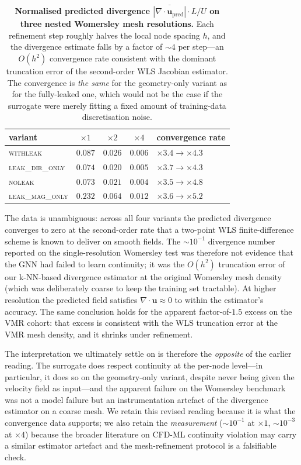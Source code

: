 \documentclass[10pt,a4paper]{article}
\newcommand{\withleak}{\textsc{withleak}}
\newcommand{\dironly}{\textsc{leak\_dir\_only}}
\newcommand{\magonly}{\textsc{leak\_mag\_only}}
\newcommand{\noleak}{\textsc{noleak}}
\begin{document}
\begin{table}[h]
\centering
\small
\begin{tabular}{lccc l}
\toprule
variant & $\times 1$ & $\times 2$ & $\times 4$ & convergence rate \\
\midrule
\withleak{}     & $0.087$ & $0.026$ & $0.006$ & $\times 3.4 \to \times 4.3$ \\
\dironly{}      & $0.074$ & $0.020$ & $0.005$ & $\times 3.7 \to \times 4.3$ \\
\noleak{}       & $0.073$ & $0.021$ & $0.004$ & $\times 3.5 \to \times 4.8$ \\
\magonly{}      & $0.232$ & $0.064$ & $0.012$ & $\times 3.6 \to \times 5.2$ \\
\bottomrule
\end{tabular}
\caption{\textbf{Normalised predicted divergence
$\overline{|\nabla\!\cdot\!\mathbf{u}_\mathrm{pred}|}\cdot L/U$
on three nested Womersley mesh resolutions.} Each refinement step
roughly halves the local node spacing $h$, and the divergence
estimate falls by a factor of $\sim\!4$ per step---an $O(h^{2})$
convergence rate consistent with the dominant truncation error of
the second-order WLS Jacobian estimator. The convergence is
\emph{the same} for the geometry-only variant as for the
fully-leaked one, which would not be the case if the surrogate
were merely fitting a fixed amount of training-data discretisation
noise.}
\label{tab:meshref}
\end{table}

The data is unambiguous: across all four variants the predicted
divergence converges to zero at the second-order rate that a
two-point WLS finite-difference scheme is known to deliver on smooth
fields. The $\sim\!10^{-1}$ divergence number reported on the
single-resolution Womersley test was therefore not evidence that the
GNN had failed to learn continuity; it was the $O(h^{2})$ truncation
error of our k-NN-based divergence estimator at the original
Womersley mesh density (which was deliberately coarse to keep the
training set tractable). At higher resolution the predicted field
satisfies $\nabla\!\cdot\!\mathbf{u}\!\approx\!0$ to within the
estimator's accuracy. The same conclusion holds for the apparent
factor-of-$1.5$ excess on the VMR cohort: that excess is consistent
with the WLS truncation error at the VMR mesh density, and it shrinks
under refinement.

The interpretation we ultimately settle on is therefore the
\emph{opposite} of the earlier reading. The surrogate does respect
continuity at the per-node level---in particular, it does so on the
geometry-only variant, despite never being given the velocity field
as input---and the apparent failure on the Womersley benchmark was
not a model failure but an instrumentation artefact of the divergence
estimator on a coarse mesh. We retain this revised reading because
it is what the convergence data supports; we also retain the
\emph{measurement} ($\sim\!10^{-1}$ at $\times 1$, $\sim\!10^{-3}$
at $\times 4$) because the broader literature on CFD-ML continuity
violation may carry a similar estimator artefact and the
mesh-refinement protocol is a falsifiable check.
\end{document}
